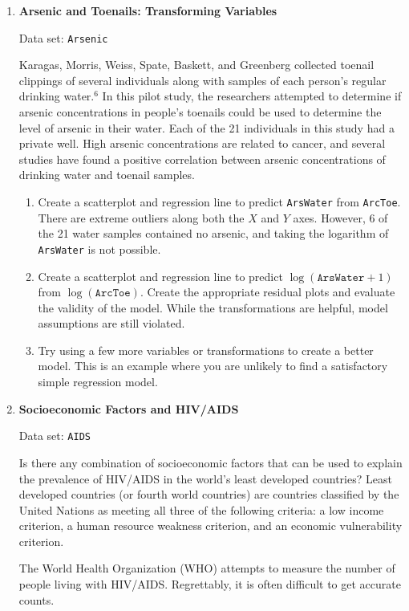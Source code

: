 \documentclass[
]{report}
\begin{document}
\begin{enumerate}
  \item \textbf{Arsenic and Toenails: Transforming Variables}

Data set: \texttt{Arsenic}

Karagas, Morris, Weiss, Spate, Baskett, and Greenberg collected toenail clippings of several individuals along with samples of each person’s regular drinking water.$^6$ In this pilot study, the researchers attempted to determine if arsenic concentrations in people’s toenails could be used to determine the level of arsenic in their water. Each of the 21 individuals in this study had a private well. High arsenic concentrations are related to cancer, and several studies have found a positive correlation between arsenic concentrations of drinking water and toenail samples.

  \begin{enumerate}
      \item Create a scatterplot and regression line to predict \texttt{ArsWater} from \texttt{ArcToe}. There are extreme outliers along both the $\scriptstyle X$ and $\scriptstyle Y$ axes. However, 6 of the 21 water samples contained no arsenic, and taking the logarithm of \texttt{ArsWater} is not possible.
      \item Create a scatterplot and regression line to predict $\scriptstyle \log(\texttt{ArsWater} + 1)$ from $\scriptstyle \log(\texttt{ArcToe})$. Create the appropriate residual plots and evaluate the validity of the model. While the transformations are helpful, model assumptions are still violated.
      \item Try using a few more variables or transformations to create a better model. This is an example where you are unlikely to find a satisfactory simple regression model.
    \end{enumerate}

  \item \textbf{Socioeconomic Factors and HIV/AIDS}

Data set: \texttt{AIDS}

Is there any combination of socioeconomic factors that can be used to explain the prevalence of HIV/AIDS in the world’s least developed countries? Least developed countries (or fourth world countries) are countries classified by the United Nations as meeting all three of the following criteria: a low income criterion, a human resource weakness criterion, and an economic vulnerability criterion.

The World Health Organization (WHO) attempts to measure the number of people living with HIV/AIDS. Regrettably, it is often difficult to get accurate counts.


\end{enumerate}
\end{document}
